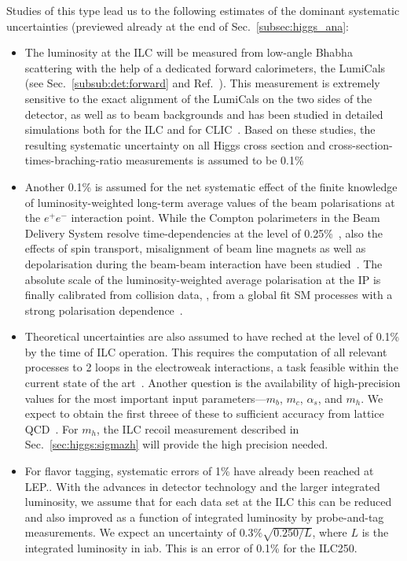 Studies of this type lead us to the following estimates of the dominant systematic uncertainties (previewed already at the end of Sec.~\ref{subsec:higgs_ana}:
\begin{itemize}
\item The luminosity at the ILC will be measured from low-angle Bhabha scattering with the help of a dedicated forward calorimeters, the LumiCals (see Sec.~\ref{subsub:det:forward} and Ref.~\cite{Abramowicz:2010bg}). This measurement is extremely sensitive to the exact alignment of the LumiCals on the two sides of the detector, as well as to beam backgrounds and has been studied in detailed simulations both for the ILC and for CLIC~\cite{Bozovic-Jelisavcic:2014aza, Lukic:2013fw}. Based on these studies, the resulting systematic uncertainty on all Higgs cross section and cross-section-times-braching-ratio measurements is assumed to be 0.1\%
\item Another 0.1\% is assumed for the net systematic effect of the finite knowledge of luminosity-weighted long-term average values of the beam polarisations at the $e^+e^-$ interaction point. While the Compton polarimeters in the Beam Delivery System resolve time-dependencies at the level of 0.25\%~\cite{Vormwald:2015hla, List:2015lsa}, also the effects of spin transport, misalignment of beam line magnets as well as depolarisation during the beam-beam interaction have been studied~\cite{Beckmann:2014mka}. The absolute scale of the luminosity-weighted average polarisation at the IP is finally calibrated from collision data, \eg, from a global fit SM processes with a strong polarisation dependence~\cite{bib:PhDRobert}. 
\item Theoretical uncertainties are also assumed to have reched at the level of 0.1\% by the time of ILC operation.   This requires the computation of all relevant processes to 2 loops in the electroweak interactions, a task feasible within the current state of the art~\cite{Blondel:2019qlh}.  Another question is the availability of high-precision values for the most important input parameters---$m_b$, $m_c$, $\alpha_s$, and $m_h$.  We expect to obtain the first threee  of these to sufficient accuracy from lattice QCD~\cite{Lepage:2014fla}.
For $m_h$, the  ILC recoil measurement described in Sec.~\ref{sec:higgs:sigmazh} will provide 
the high precision needed.
\item For flavor tagging, systematic errors of 1\% have already been reached at LEP.. With the advances in detector technology and the larger integrated luminosity, we assume that for each data set at the ILC this can be reduced  and also improved as  a function of integrated luminosity by probe-and-tag measurements.   We expect an uncertainty of 
$0.3\% \sqrt{0.250/L}$, where $L$ is the integrated luminosity in iab.  This is an error of 0.1\% for the ILC250.


\end{itemize}
